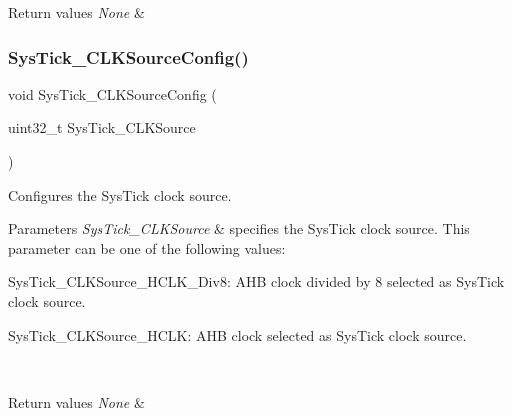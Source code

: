 \begin{DoxyRetVals}{Return values}
{\em None} & \\
\hline
\end{DoxyRetVals}
\mbox{\label{group___m_i_s_c___private___functions_ga2777d255bb06ad62bb6372a9db1ff385}} 
\subsubsection{\texorpdfstring{SysTick\_CLKSourceConfig()}{SysTick\_CLKSourceConfig()}}
{\footnotesize\ttfamily void Sys\+Tick\+\_\+\+C\+L\+K\+Source\+Config (\begin{DoxyParamCaption}\item[{uint32\+\_\+t}]{Sys\+Tick\+\_\+\+C\+L\+K\+Source }\end{DoxyParamCaption})}



Configures the Sys\+Tick clock source. 


\begin{DoxyParams}{Parameters}
{\em Sys\+Tick\+\_\+\+C\+L\+K\+Source} & specifies the Sys\+Tick clock source. This parameter can be one of the following values\+: \begin{DoxyItemize}
\item Sys\+Tick\+\_\+\+C\+L\+K\+Source\+\_\+\+H\+C\+L\+K\+\_\+\+Div8\+: A\+HB clock divided by 8 selected as Sys\+Tick clock source. \item Sys\+Tick\+\_\+\+C\+L\+K\+Source\+\_\+\+H\+C\+LK\+: A\+HB clock selected as Sys\+Tick clock source. \end{DoxyItemize}
\\
\hline
\end{DoxyParams}

\begin{DoxyRetVals}{Return values}
{\em None} & \\
\hline
\end{DoxyRetVals}
